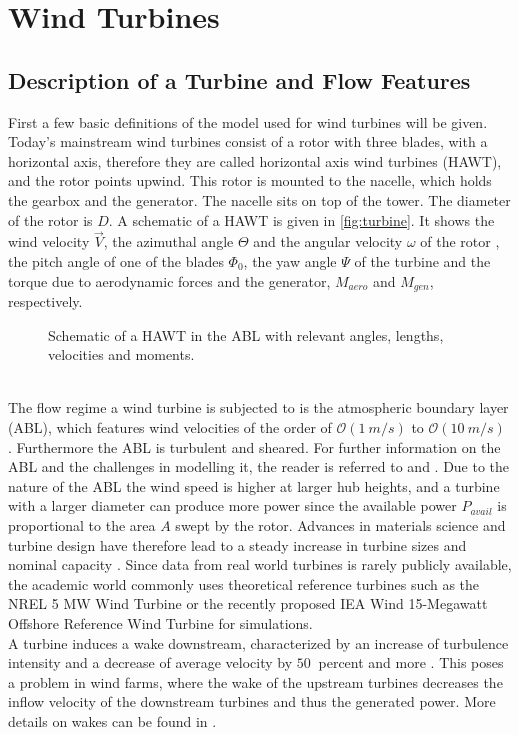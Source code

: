 \section{Wind Turbines}
\subsection{Description of a Turbine and Flow Features}
First a few basic definitions of the model used for wind turbines will be given. Today's mainstream wind turbines consist of a rotor with three blades, with a horizontal axis, therefore they are called horizontal axis wind turbines (HAWT), and the rotor points upwind.  This rotor is mounted to the nacelle, which holds the gearbox and the generator. The nacelle sits on top of the tower. The diameter of the rotor is $D$. A schematic of a HAWT is given in \autoref{fig:turbine}. It shows the wind velocity $\vec{V}$, the azimuthal angle $\Theta$ and the angular velocity $\omega$ of the rotor , the pitch angle of one of the blades $\Phi_0$, the yaw angle $\Psi$ of the turbine and the torque due to aerodynamic forces and the generator, $M_{aero}$ and $M_{gen}$, respectively.
\begin{figure}[h]
	\centering
	\def\svgwidth{0.5 \textwidth}
	
	\caption{Schematic of a HAWT in the ABL with relevant angles, lengths, velocities and moments.}
	\label{fig:turbine}
\end{figure}\\
The flow regime a wind turbine is subjected to is the atmospheric boundary layer (ABL), which features wind velocities of the order of $\mathcal{O}(\SI{1}{m/s})$ to $\mathcal{O}(\SI{10}{m/s})$ \cite[p. 5]{kaimal_atmospheric_1994}. Furthermore the ABL is turbulent and sheared. For further information on the ABL and the challenges in modelling it, the reader is referred to \cite{kaimal_atmospheric_1994} and \cite{holtslag_stable_2013}. Due to the nature of the ABL the wind speed is higher at larger hub heights, and a turbine with a larger diameter can produce more power since the available power $P_{avail}$ is proportional to the area $A$ swept by the rotor. Advances in materials science and turbine design have therefore lead to a steady increase in turbine sizes and nominal capacity \cite{rohrig_powering_2019}. Since data from real world turbines is rarely publicly available, the academic world commonly uses theoretical reference turbines such as the NREL 5 MW Wind Turbine \cite{jonkman_definition_2009} or the recently proposed IEA Wind 15-Megawatt Offshore Reference Wind Turbine \cite{gaertner_iea_2020} for simulations.\cite{hansen_aerodynamics_2008} \\
A turbine induces a wake downstream, characterized by an increase of turbulence intensity and a decrease of average velocity by $\SI{50}{}$ percent and more \cite{abkar_wake_2016}. This poses a problem in wind farms, where the wake of the upstream turbines decreases the inflow velocity of the downstream turbines and thus the generated power. More details on wakes can be found in \cite{boersma_tutorial_2017}.

